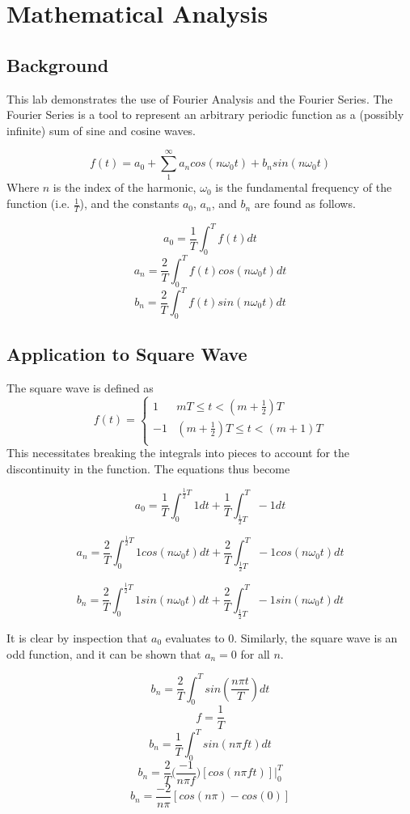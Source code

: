 \documentclass[a4paper,titlepage]{article}
\begin{document}
	\section{Mathematical Analysis}
	\subsection{Background}
	This lab demonstrates the use of Fourier Analysis and the Fourier Series. The Fourier Series is a tool to represent an arbitrary periodic function as a (possibly infinite) sum of sine and cosine waves.
	
	$$f(t) = a_0 + \sum_{1}^{\infty} a_n cos(n \omega_0 t) + b_n sin(n \omega_0 t)$$ 
	Where $n$ is the index of the harmonic, $\omega_0$ is the fundamental frequency of the function (i.e. $\frac{1}{T}$), and the constants $a_0$, $a_n$, and $b_n$ are found as follows.
	
	$$a_0 = \frac{1}{T} \int_{0}^{T}f(t)dt$$
	$$a_n = \frac{2}{T} \int_{0}^{T}f(t) cos(n \omega_0 t)dt$$
	$$b_n = \frac{2}{T} \int_{0}^{T}f(t) sin(n \omega_0 t)dt$$
	\subsection{Application to Square Wave}
	The square wave is defined as
	\[ f(t) =  \begin{cases}
	1 & mT \leq t < (m + \frac{1}{2})T \\
	-1 & (m + \frac{1}{2})T \leq t < (m + 1)T \\
	\end{cases}
	\]
	This necessitates breaking the integrals into pieces to account for the discontinuity in the function. The equations thus become
	
	$$a_0 = \frac{1}{T} \int_{0}^{\frac{1}{2}T}1dt + \frac{1}{T} \int_{\frac{1}{2}T}^{T} -1dt$$ 
	
	$$a_n = \frac{2}{T} \int_{0}^{\frac{1}{2}T}1cos(n \omega_0 t)dt + \frac{2}{T} \int_{\frac{1}{2}T}^{T}-1cos(n \omega_0 t)dt $$
	
	$$b_n = \frac{2}{T} \int_{0}^{\frac{1}{2}T}1sin(n \omega_0 t)dt + \frac{2}{T} \int_{\frac{1}{2}T}^{T} -1sin(n \omega_0 t)dt $$
	
	It is clear by inspection that $a_0$ evaluates to 0. Similarly, the square wave is an odd function, and it can be shown that $a_n = 0$ for all $n$.
	
	$$b_n = \frac{2}{T} \int_{0}^{T} sin(\frac{n \pi t}{T}) dt$$
	$$f = \frac{1}{T}$$
	$$b_n = \frac{1}{T} \int_{0}^{T} sin(n \pi f t) dt$$
	$$b_n = \frac{2}{T} \Big(\frac{-1}{n \pi f}\Big) [cos(n \pi f t)] \Big|_0^T$$
	$$b_n = \frac{-2}{n \pi} [cos(n \pi) - cos(0)]$$
	
\end{document}
